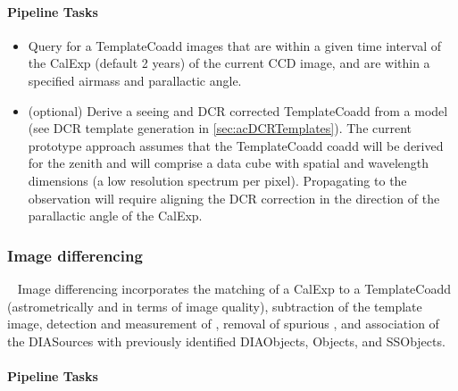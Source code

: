 \paragraph{Pipeline Tasks}

\begin{itemize}
\item Query for a TemplateCoadd images that are within a given time interval of the CalExp  (default 2 years) of the current CCD image, and are within a specified airmass and parallactic angle.
\item (optional) Derive a seeing and DCR corrected TemplateCoadd from a model (see DCR template generation in \ref{sec:acDCRTemplates}). The current prototype approach assumes that the TemplateCoadd coadd will be derived for the zenith and will comprise a data cube with spatial and wavelength dimensions (a low resolution spectrum per pixel). Propagating to the observation will require aligning the DCR correction in the direction of the parallactic angle of the CalExp.
\end{itemize}

\subsubsection{Image differencing}~
Image differencing incorporates the matching of a CalExp to a TemplateCoadd (astrometrically and in terms of image quality), subtraction of the template image, detection and measurement of \DIASources, removal of spurious \DIASources, and association of the DIASources with previously identified DIAObjects, Objects, and SSObjects. 

\paragraph{Pipeline Tasks}

